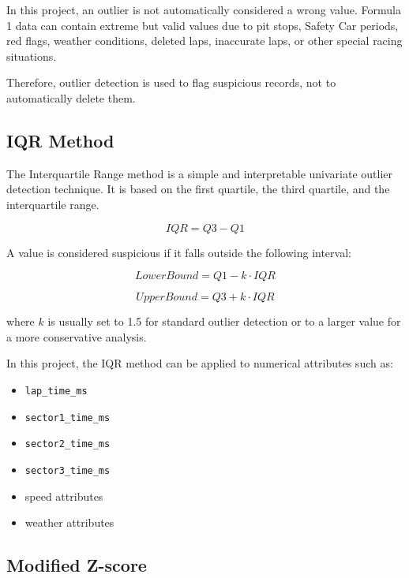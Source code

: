 \documentclass[a4paper,11pt]{article}
\begin{document}
	In this project, an outlier is not automatically considered a wrong value. Formula 1 data
	can contain extreme but valid values due to pit stops, Safety Car periods, red flags,
	weather conditions, deleted laps, inaccurate laps, or other special racing situations.
	
	Therefore, outlier detection is used to flag suspicious records, not to automatically delete
	them.
	
	\subsection{IQR Method}
	
	The Interquartile Range method is a simple and interpretable univariate outlier detection
	technique. It is based on the first quartile, the third quartile, and the interquartile range.
	
	\[
	IQR = Q3 - Q1
	\]
	
	A value is considered suspicious if it falls outside the following interval:
	
	\[
	LowerBound = Q1 - k \cdot IQR
	\]
	
	\[
	UpperBound = Q3 + k \cdot IQR
	\]
	
	where \(k\) is usually set to 1.5 for standard outlier detection or to a larger value for a
	more conservative analysis.
	
	In this project, the IQR method can be applied to numerical attributes such as:
	
	\begin{itemize}
		\item \texttt{lap\_time\_ms}
		\item \texttt{sector1\_time\_ms}
		\item \texttt{sector2\_time\_ms}
		\item \texttt{sector3\_time\_ms}
		\item speed attributes
		\item weather attributes
	\end{itemize}
	
	\subsection{Modified Z-score}
	
\end{document}
